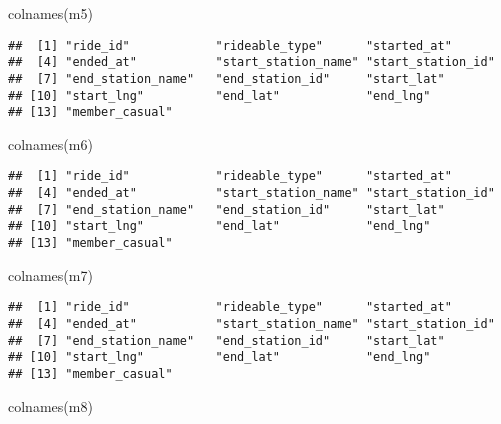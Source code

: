 \documentclass[
]{article}
\newenvironment{Shaded}{\begin{snugshade}}{\end{snugshade}}
\newcommand{\FunctionTok}[1]{\textcolor[rgb]{0.00,0.00,0.00}{#1}}
\newcommand{\NormalTok}[1]{#1}
\begin{document}
\begin{Shaded}
\begin{Highlighting}[]
\FunctionTok{colnames}\NormalTok{(m5)}
\end{Highlighting}
\end{Shaded}

\begin{verbatim}
##  [1] "ride_id"            "rideable_type"      "started_at"        
##  [4] "ended_at"           "start_station_name" "start_station_id"  
##  [7] "end_station_name"   "end_station_id"     "start_lat"         
## [10] "start_lng"          "end_lat"            "end_lng"           
## [13] "member_casual"
\end{verbatim}

\begin{Shaded}
\begin{Highlighting}[]
\FunctionTok{colnames}\NormalTok{(m6)}
\end{Highlighting}
\end{Shaded}

\begin{verbatim}
##  [1] "ride_id"            "rideable_type"      "started_at"        
##  [4] "ended_at"           "start_station_name" "start_station_id"  
##  [7] "end_station_name"   "end_station_id"     "start_lat"         
## [10] "start_lng"          "end_lat"            "end_lng"           
## [13] "member_casual"
\end{verbatim}

\begin{Shaded}
\begin{Highlighting}[]
\FunctionTok{colnames}\NormalTok{(m7)}
\end{Highlighting}
\end{Shaded}

\begin{verbatim}
##  [1] "ride_id"            "rideable_type"      "started_at"        
##  [4] "ended_at"           "start_station_name" "start_station_id"  
##  [7] "end_station_name"   "end_station_id"     "start_lat"         
## [10] "start_lng"          "end_lat"            "end_lng"           
## [13] "member_casual"
\end{verbatim}

\begin{Shaded}
\begin{Highlighting}[]
\FunctionTok{colnames}\NormalTok{(m8)}
\end{Highlighting}
\end{Shaded}
\end{document}
